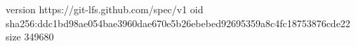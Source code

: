 version https://git-lfs.github.com/spec/v1
oid sha256:ddc1bd98ae054bae3960dae670e5b26ebebed92695359a8c4fc18753876cde22
size 349680
